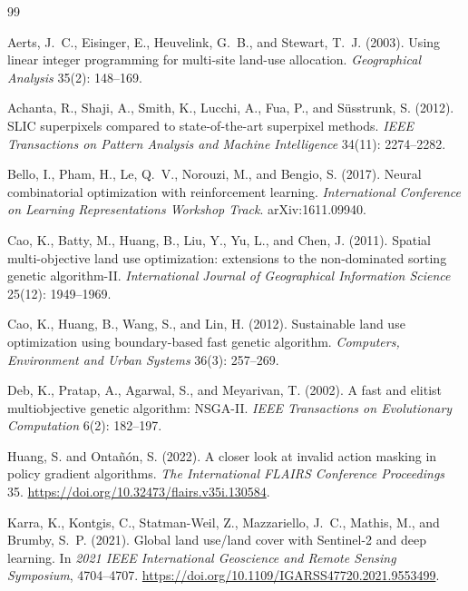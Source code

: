 \documentclass[]{interact}
\theoremstyle{plain}
\begin{document}

\begin{thebibliography}{99}

Aerts, J.~C., Eisinger, E., Heuvelink, G.~B., and Stewart, T.~J. (2003).
Using linear integer programming for multi-site land-use allocation.
\textit{Geographical Analysis} 35(2): 148--169.

Achanta, R., Shaji, A., Smith, K., Lucchi, A., Fua, P., and S{\"u}sstrunk, S. (2012).
SLIC superpixels compared to state-of-the-art superpixel methods.
\textit{IEEE Transactions on Pattern Analysis and Machine Intelligence} 34(11): 2274--2282.

Bello, I., Pham, H., Le, Q.~V., Norouzi, M., and Bengio, S. (2017).
Neural combinatorial optimization with reinforcement learning.
\textit{International Conference on Learning Representations Workshop Track}.
arXiv:1611.09940.

Cao, K., Batty, M., Huang, B., Liu, Y., Yu, L., and Chen, J. (2011).
Spatial multi-objective land use optimization: extensions to the non-dominated sorting genetic algorithm-II.
\textit{International Journal of Geographical Information Science} 25(12): 1949--1969.

Cao, K., Huang, B., Wang, S., and Lin, H. (2012).
Sustainable land use optimization using boundary-based fast genetic algorithm.
\textit{Computers, Environment and Urban Systems} 36(3): 257--269.

Deb, K., Pratap, A., Agarwal, S., and Meyarivan, T. (2002).
A fast and elitist multiobjective genetic algorithm: NSGA-II.
\textit{IEEE Transactions on Evolutionary Computation} 6(2): 182--197.

Huang, S. and Onta\~{n}\'{o}n, S. (2022).
A closer look at invalid action masking in policy gradient algorithms.
\textit{The International FLAIRS Conference Proceedings} 35.
\url{https://doi.org/10.32473/flairs.v35i.130584}.

Karra, K., Kontgis, C., Statman-Weil, Z., Mazzariello, J.~C., Mathis, M., and Brumby, S.~P. (2021).
Global land use/land cover with {Sentinel}-2 and deep learning.
In \textit{2021 IEEE International Geoscience and Remote Sensing Symposium}, 4704--4707.
\url{https://doi.org/10.1109/IGARSS47720.2021.9553499}.


\end{thebibliography}
\end{document}
